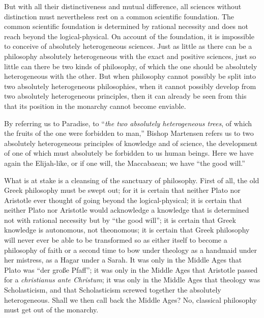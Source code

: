 \documentclass[12pt]{book}
\newcommand{\opage}[1]{\marginnote{\footnotesize\textit{[#1]}}}
\begin{document}
But with all their distinctiveness and mutual difference, all sciences without distinction must nevertheless rest on a common scientific foundation. The common scientific foundation is determined by rational necessity and does not reach beyond the logical-physical. On account of the foundation, it is impossible to conceive of absolutely heterogeneous sciences. Just as little as there can be a philosophy absolutely heterogeneous with the exact and positive sciences, just so little can there be two kinds of philosophy, of which the one should be absolutely heterogeneous with the other. But when philosophy cannot possibly be split into two absolutely heterogeneous philosophies, when it cannot possibly develop from two absolutely heterogeneous principles, then it can already be seen from this that its position in the monarchy cannot become enviable.

By referring us to Paradise, to ``\emph{the two absolutely heterogeneous trees}, of which the fruits of the one were forbidden to man,'' Bishop Martensen refers us to
\opage{105}\setcounter{footnote}{0}%
two absolutely heterogeneous principles of knowledge and of science, the development of one of which must absolutely be forbidden to us human beings. Here we have again the Elijah-like, or if one will, the Maccabaean; we have ``the good will.''

What is at stake is a cleansing of the sanctuary of philosophy. First of all, the old Greek philosophy must be swept out; for it is certain that neither Plato nor Aristotle ever thought of going beyond the logical-physical; it is certain that neither Plato nor Aristotle would acknowledge a knowledge that is determined not with rational necessity but by ``the good will''; it is certain that Greek knowledge is autonomous, not theonomous; it is certain that Greek philosophy will never ever be able to be transformed so as either itself to become a philosophy of faith or a second time to bow under theology as a handmaid under her mistress, as a Hagar under a Sarah. It was only in the Middle Ages that Plato was ``der große Pfaff''; it was only in the Middle Ages that Aristotle passed for a \textit{christianus ante Christum}; it was only in the Middle Ages that theology was Scholasticism, and that Scholasticism screwed together the absolutely heterogeneous. Shall we then call back the Middle Ages? No, classical philosophy must get out of the monarchy.
\end{document}
